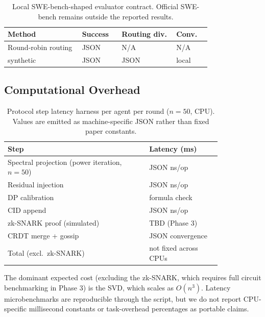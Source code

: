 \begin{table}[b]
  \centering
  \footnotesize
  \caption{Local SWE-bench-shaped evaluator contract. Official SWE-bench remains
    outside the reported results.}
  \label{tab:sweb_results}
  \begin{tabular}{p{0.30\linewidth}p{0.13\linewidth}p{0.22\linewidth}p{0.14\linewidth}}
    \toprule
    Method & Success & Routing div. & Conv. \\
    \midrule
    Round-robin routing    & JSON & N/A & N/A \\
    \fedsink{} synthetic   & JSON & JSON & local \\
    \bottomrule
  \end{tabular}
\end{table}

\subsection{Computational Overhead}

\begin{table}[t]
  \centering
  \caption{Protocol step latency harness per agent per round ($n{=}50$, CPU).
    Values are emitted as machine-specific JSON rather than fixed paper constants.}
  \label{tab:latency}
  \footnotesize
  \begin{tabular}{p{0.55\linewidth}p{0.28\linewidth}}
    \toprule
    Step & Latency (ms) \\
    \midrule
    Spectral projection (power iteration, $n{=}50$) & JSON ns/op \\
    Residual injection & JSON ns/op \\
    DP calibration  & formula check \\
    CID append & JSON ns/op \\
    zk-SNARK proof (simulated) & TBD (Phase 3) \\
    CRDT merge + gossip & JSON convergence \\
    \midrule
    Total (excl.\ zk-SNARK) & not fixed across CPUs \\
    \bottomrule
  \end{tabular}
\end{table}

The dominant expected cost (excluding the zk-SNARK, which requires full circuit
benchmarking in Phase 3) is the SVD, which scales as $O(n^3)$.  Latency microbenchmarks
are reproducible through the script, but we do not report CPU-specific millisecond
constants or task-overhead percentages as portable claims.
